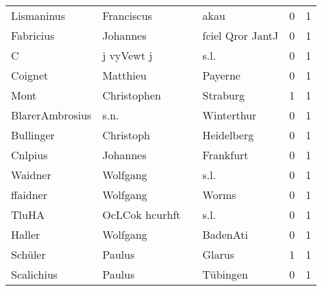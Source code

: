 \begin{tabular}{llllrr}
               Lismaninus &                         Franciscus &             &                                        akau &          0 &         1 \\
                Fabricius &                           Johannes &             &                            fciel Qror JantJ &          0 &         1 \\
                        C &                         j vyVewt j &             &                                        s.l. &          0 &         1 \\
                  Coignet &                           Matthieu &             &                                     Payerne &          0 &         1 \\
                     Mont &                        Christophen &             &                                    Straburg &          1 &         1 \\
          BlarerAmbrosius &                               s.n. &             &                                  Winterthur &          0 &         1 \\
                Bullinger &                          Christoph &             &                                  Heidelberg &          0 &         1 \\
                  Cnlpius &                           Johannes &             &                                   Frankfurt &          0 &         1 \\
                  Waidner &                           Wolfgang &             &                                        s.l. &          0 &         1 \\
                 ffaidner &                           Wolfgang &             &                                       Worms &          0 &         1 \\
                    TluHA &                     OcLCok hcurhft &             &                                        s.l. &          0 &         1 \\
                   Haller &                           Wolfgang &             &                                    BadenAti &          0 &         1 \\
                  Schüler &                             Paulus &             &                                      Glarus &          1 &         1 \\
               Scalichius &                             Paulus &             &                                    Tübingen &          0 &         1 \\

\end{tabular}
